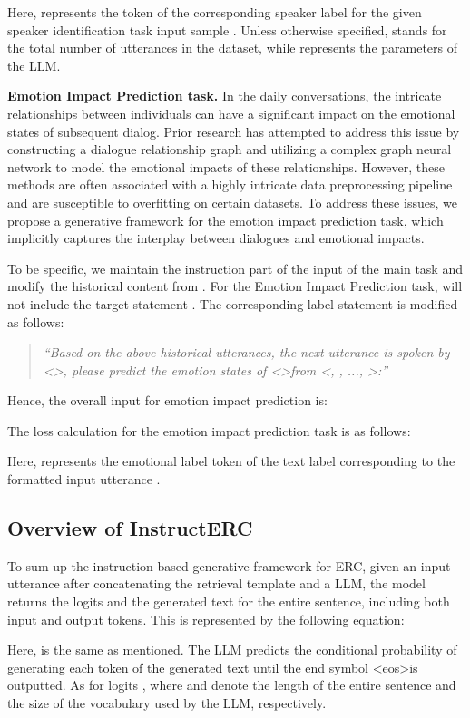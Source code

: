 \documentclass[conference]{IEEEtran}
\begin{document}
Here,  represents the token of the corresponding speaker label for the given speaker identification task input sample .
Unless otherwise specified,  stands for the total number of utterances in the dataset, while  represents the parameters of the LLM.

\textbf{Emotion Impact Prediction task.}
In the daily conversations, the intricate relationships between individuals can have a significant impact on the emotional states of subsequent dialog. Prior research has attempted to address this issue by constructing a dialogue relationship graph and utilizing a complex graph neural network to model the emotional impacts of these relationships. 
However, these methods are often associated with a highly intricate data preprocessing pipeline and are susceptible to overfitting on certain datasets. To address these issues, we propose a generative framework for the emotion impact prediction task, which implicitly captures the interplay between dialogues and emotional impacts.

To be specific, we maintain the instruction part  of the input  of the main task and modify the historical content  from . For the Emotion Impact Prediction task,  will not include the target statement .
The corresponding label statement  is modified as follows:
\begin{quote}
\textit{``Based on the above historical utterances, the next utterance is spoken by \textless  \textgreater, please predict the emotion states of \textless  \textgreater  from \textless , , ...,  \textgreater:''}
\end{quote}
Hence, the overall input for emotion impact prediction is:

The loss calculation for the emotion impact prediction task is as follows:

Here,  represents the emotional label token of the text label  corresponding to the formatted input utterance . 
\subsection{Overview of InstructERC}

To sum up the instruction based generative framework for ERC, given an input utterance  after concatenating the retrieval template  and a LLM, the model returns the logits  and the generated text  for the entire sentence, including both input and output tokens. This is represented by the following equation:


Here,  is the same as mentioned. The LLM predicts the conditional probability  of generating each token  of the generated text  until the end symbol \textless eos\textgreater is outputted. 
As for logits ,
where  and  denote the length of the entire sentence and the size of the vocabulary used by the LLM, respectively.
\end{document}
